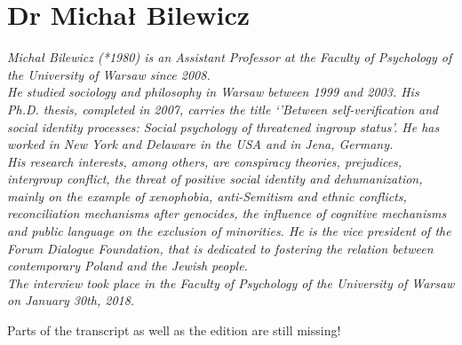 \section{Dr Michał Bilewicz}
\textit{Michał Bilewicz (*1980) is an Assistant Professor at the Faculty of Psychology of the University of Warsaw since 2008. \\
He studied sociology and philosophy in Warsaw between 1999 and 2003. His Ph.D. thesis, completed in 2007, carries the title `'Between self-verification and social identity processes: Social psychology of threatened ingroup status'. 
He has worked in New York and Delaware in the USA and in Jena, Germany. \\
His research interests, among others, are conspiracy theories, prejudices, intergroup conflict, the threat of positive social identity and dehumanization, mainly on the example of xenophobia, anti-Semitism and ethnic conflicts, reconciliation mechanisms after genocides, the influence of cognitive mechanisms and public language on the exclusion of minorities.
He is the vice president of the Forum Dialogue Foundation, that is dedicated to fostering the relation between contemporary Poland and the Jewish people. \\
The interview took place in the Faculty of Psychology of the University of Warsaw on January 30th, 2018.}
\vspace*{2em}

Parts of the transcript as well as the edition are still missing!